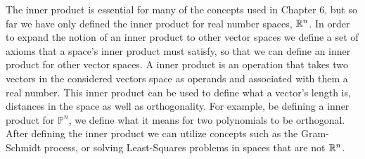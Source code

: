 \documentclass{../mathhomework}
\begin{document}
\maketitle

\pagebreak

The inner product is essential for many of the concepts used in Chapter 6, but so far we have only defined the inner product for
real number spaces, $\mathbb{R}^n$. In order to expand the notion of an inner product to other vector spaces we define a set of axioms
that a space's inner product must satisfy, so that we can define an inner product for other vector spaces. A inner product is an
operation that takes two vectors in the considered vectors space as operands and associated with them a real number. This inner
product can be used to define what a vector's length is, distances in the space as well as orthogonality. For example, be defining a
inner product for $\mathbb{P}^n$, we define what it means for two polynomials to be orthogonal. After defining the inner product we can
utilize concepts such as the Gram-Schmidt process, or solving Least-Squares problems in spaces that are not $\mathbb{R}^n$.

\pagebreak


\end{document}

